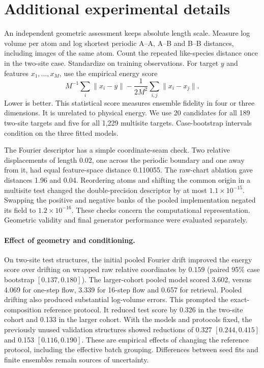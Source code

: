 \documentclass[10pt]{article}
\begin{document}
\section{Additional experimental details}\label{sec:impl}



An independent geometric assessment keeps absolute length scale. Measure log volume per atom and log shortest periodic A--A, A--B and B--B distances, including images of the same atom. Count the repeated like-species distance once in the two-site case. Standardize on training observations. For target $y$ and features $x_1,\ldots,x_M$, use the empirical energy score \cite{energy}
\[
 M^{-1}\sum_i\|x_i-y\|-\frac{1}{2M^2}\sum_{i,j}\|x_i-x_j\|.
\]
Lower is better. This statistical score measures ensemble fidelity in four or three dimensions. It is unrelated to physical energy. We use 20 candidates for all 189 two-site targets and five for all 1,229 multisite targets. Case-bootstrap intervals condition on the three fitted models.

The Fourier descriptor has a simple coordinate-seam check. Two relative displacements of length 0.02, one across the periodic boundary and one away from it, had equal feature-space distance 0.110055. The raw-chart ablation gave distances 1.96 and 0.04. Reordering atoms and shifting the common origin in a multisite test changed the double-precision descriptor by at most $1.1\times10^{-15}$. Swapping the positive and negative banks of the pooled implementation negated its field to $1.2\times10^{-16}$. These checks concern the computational representation. Geometric validity and final generator performance were evaluated separately.

\paragraph{Effect of geometry and conditioning.} On two-site test structures, the initial pooled Fourier drift improved the energy score over drifting on wrapped raw relative coordinates by $0.159$ (paired 95\% case bootstrap $[0.137,0.180]$). The larger-cohort pooled model scored 3.602, versus 4.069 for one-step flow, 3.339 for 16-step flow and 0.657 for retrieval. Pooled drifting also produced substantial log-volume errors. This prompted the exact-composition reference protocol. It reduced test score by 0.326 in the two-site cohort and 0.133 in the larger cohort. With the models and protocols fixed, the previously unused validation structures showed reductions of 0.327 $[0.244,0.415]$ and 0.153 $[0.116,0.190]$. These are empirical effects of changing the reference protocol, including the effective batch grouping. Differences between seed fits and finite ensembles remain sources of uncertainty.
\end{document}
